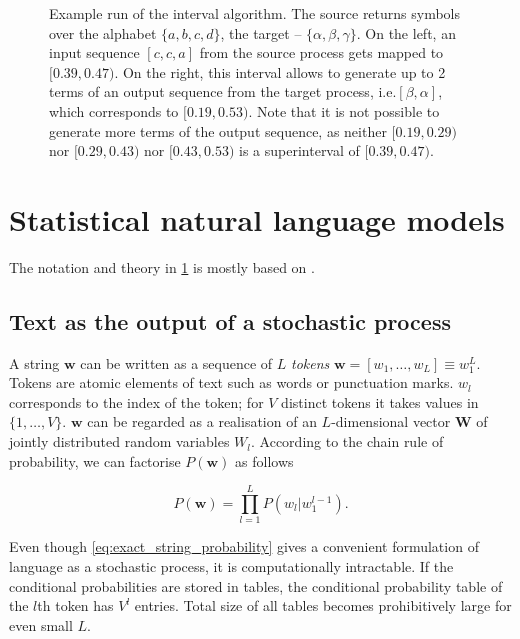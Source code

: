 \documentclass[draft]{IIBproject}
\makeatletter
\newcommand*{\ie}{i.e.\@\xspace}
\makeatother
\begin{document}
\begin{figure}[h]
\begin{tikzpicture}[scale=0.05]
	\end{tikzpicture}

	\caption{\label{fig:interval_algorithm}Example run of the interval algorithm. The source returns symbols over the alphabet $\{a,b,c,d\}$, the target -- $\{\alpha,\beta,\gamma\}$. On the left, an input sequence $[c,c,a]$ from the source process gets mapped to $[0.39,0.47)$. On the right, this interval allows to generate up to 2 terms of an output sequence from the target process, \ie $[\beta,\alpha]$, which corresponds to $[0.19,0.53)$. Note that it is not possible to generate more terms of the output sequence, as neither $[0.19,0.29)$ nor $[0.29,0.43)$ nor $[0.43,0.53)$ is a superinterval of $[0.39,0.47)$.}

\end{figure}

\newpage
\section{Statistical natural language models}
\label{sec:snlm}

The notation and theory in \cref{sec:snlm} is mostly based on \cite{4f11:statistical_language_models, 4f11:smt_systems, coursera:nlp}.

\subsection{Text as the output of a stochastic process}

A string $\mathbf w$ can be written as a sequence of $L$ \emph{tokens} $\mathbf w = [ w_1, \dots, w_L ] \equiv w_1^L$. Tokens are atomic elements of text such as words or punctuation marks. $w_l$ corresponds to the index of the token; for $V$ distinct tokens it takes values in $\{1, \dots, V\}$. $\mathbf w$ can be regarded as a realisation of an $L$-dimensional vector $\mathbf W$ of jointly distributed random variables $W_l$. According to the chain rule of probability, we can factorise $P(\mathbf w)$ as follows

\begin{equation}
\label{eq:exact_string_probability}
P(\mathbf w) = \prod_{l=1}^{L} P( w_l | w_1^{l-1} ) .
\end{equation}

Even though \cref{eq:exact_string_probability} gives a convenient formulation of language as a stochastic process, it is computationally intractable. If the conditional probabilities are stored in tables, the conditional probability table of the $l$th token has $V^l$ entries. Total size of all tables becomes prohibitively large for even small $L$.
\end{document}
